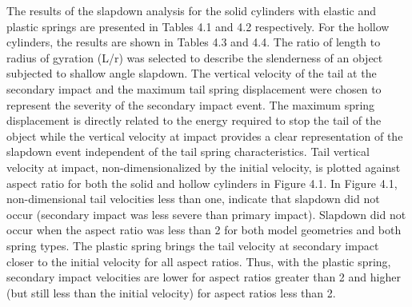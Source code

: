      The results of the slapdown analysis for the solid cylinders
with elastic and plastic springs
are presented in Tables 4.1 and 4.2 
respectively.  For the hollow cylinders, the results are shown 
in Tables 4.3 and 4.4. 
The ratio of length to
radius of gyration (L/r) was
selected to describe the slenderness of an object
subjected to shallow angle slapdown.
The vertical velocity of the tail
at the secondary impact and the maximum tail spring displacement 
were chosen to represent the severity of the secondary
impact event.  The maximum spring displacement is directly related to
the energy required to stop the tail of the object while the vertical
velocity at impact provides a clear representation of the slapdown
event independent of the tail spring characteristics. Tail vertical
velocity at impact, non-dimensionalized by the initial velocity, is
plotted against aspect ratio for both the solid and hollow
cylinders in Figure 4.1.  
In Figure 4.1, non-dimensional tail velocities
less than one, indicate that slapdown did not occur (secondary impact
was less severe than primary impact).  Slapdown did not occur when the
aspect ratio was less than 2 for both model geometries and both
spring types.  The plastic spring brings the tail
velocity at secondary impact closer to the initial velocity for all
aspect ratios.  Thus, with the plastic spring, secondary impact
velocities are lower for aspect ratios greater than 2 and higher 
(but still less than the initial velocity) for aspect ratios less
than 2.

